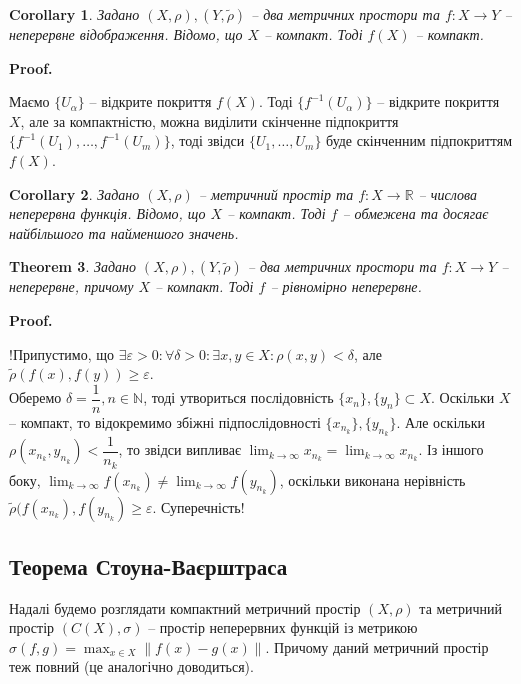 \documentclass[a4paper, 10pt]{article}
\makeatletter
\theoremstyle{theoremdd}
\newtheorem{theorem}{Theorem}[subsection]
\theoremstyle{theoremdd}
\theoremstyle{theoremdd}
\theoremstyle{theoremdd}
\theoremstyle{theoremdd}
\theoremstyle{theoremdd}
\theoremstyle{theoremdd}
\theoremstyle{theoremdd}
\newtheorem{corollary}[theorem]{Corollary}
\renewenvironment{proof}[1][Proof.\\]{\par
\pushQED{\hfill \qed}%
\normalfont \topsep6\p@\@plus6\p@\relax
\trivlist
\item\relax
{\bfseries
#1\@addpunct{.}}\hspace\labelsep\ignorespaces
}{%
\popQED\endtrivlist\@endpefalse
}
\makeatother
\begin{document}
\begin{corollary}
Задано $(X,\rho), (Y,\tilde{\rho})$ -- два метричних простори та $f \colon X \to Y$ -- неперервне відображення. Відомо, що $X$ -- компакт. Тоді $f(X)$ -- компакт.
\end{corollary}

\begin{proof}
Маємо $\{U_\alpha\}$ -- відкрите покриття $f(X)$. Тоді $\{f^{-1}(U_\alpha)\}$ -- відкрите покриття $X$, але за компактністю, можна виділити скінченне підпокриття $\{f^{-1}(U_1),\dots,f^{-1}(U_m)\}$, тоді звідси $\{U_1,\dots,U_m\}$ буде скінченним підпокриттям $f(X)$.
\end{proof}

\begin{corollary}
Задано $(X,\rho)$ -- метричний простір та $f \colon X \to \mathbb{R}$ -- числова неперервна функція. Відомо, що $X$ -- компакт. Тоді $f$ -- обмежена та досягає найбільшого та найменшого значень.
\end{corollary}

\begin{theorem}
Задано $(X,\rho), (Y,\tilde{\rho})$ -- два метричних простори та $f \colon X \to Y$ -- неперервне, причому $X$ -- компакт. Тоді $f$ -- рівномірно неперервне.
\end{theorem}

\begin{proof}
!Припустимо, що $\exists \varepsilon > 0: \forall \delta > 0: \exists x,y \in X: \rho(x,y) < \delta$, але $\tilde{\rho}(f(x),f(y)) \geq \varepsilon$.\\
Оберемо $\delta = \dfrac{1}{n}, n \in \mathbb{N}$, тоді утвориться послідовність $\{x_n\}, \{y_n\} \subset X$. Оскільки $X$ -- компакт, то відокремимо збіжні підпослідовності $\{x_{n_k}\}, \{y_{n_k}\}$. Але оскільки $\rho(x_{n_k}, y_{n_k}) < \dfrac{1}{n_k}$, то звідси випливає $\displaystyle\lim_{k \to \infty} x_{n_k} = \lim_{k \to \infty} x_{n_k}$. Із іншого боку, $\displaystyle\lim_{k \to \infty} f(x_{n_k}) \neq \lim_{k \to \infty} f(y_{n_k})$, оскільки виконана нерівність $\tilde{\rho}(f(x_{n_k}), f(y_{n_k}) \geq \varepsilon$. Суперечність!
\end{proof}

\subsection{Теорема Стоуна-Ваєрштраса}
Надалі будемо розглядати компактний метричний простір $(X,\rho)$ та метричний простір $(C(X), \sigma)$ -- простір неперервних функцій із метрикою $\sigma(f,g) = \displaystyle\max_{x \in X}\| f(x) - g(x)\|$. Причому даний метричний простір теж повний (це аналогічно доводиться).
\end{document}
